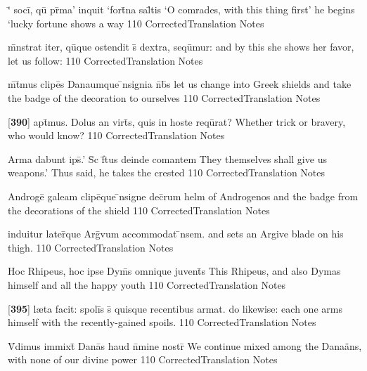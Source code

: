 \latline
  {`\={} soci\={\macron {\i}}, qu\={} pr\={\macron {\i}}ma' inquit `fort\={}na sal\={}tis}
  { `O comrades, with this thing first' he begins `lucky fortune shows a way }
  {110}
  { CorrectedTranslation }
  { Notes }


\latline
  {m\={}nstrat iter, qu\={}que ostendit s\={} dextra, sequ\={}mur:}
  { and by this she shows her favor, let us follow: }
  {110}
  { CorrectedTranslation }
  { Notes }


\latline
  {m\={}t\={}mus clipe\={}s Danaumque \={\macron {\i}}nsignia n\={}b\={\macron {\i}}s}
  { let us change into Greek shields and take the badge of the decoration to ourselves }
  {110}
  { CorrectedTranslation }
  { Notes }


\latline
  {[\textbf{390}] apt\={}mus.  Dolus an virt\={}s, quis in hoste requ\={\macron {\i}}rat?}
  { Whether trick or bravery, who would know? }
  {110}
  { CorrectedTranslation }
  { Notes }


\latline
  {Arma dabunt ips\={\macron {\i}}.'  S\={\macron {\i}}c f\={}tus deinde comantem}
  { They themselves shall give us weapons.'  Thus said, he takes the crested}
  {110}
  { CorrectedTranslation }
  { Notes }


\latline
  {Androge\={} galeam clipe\={\macron {\i}}que \={\macron {\i}}nsigne dec\={}rum}
  { helm of Androgenos and the badge from the decorations of the shield }
  {110}
  { CorrectedTranslation }
  { Notes }


\latline
  {induitur later\={\macron {\i}}que Arg\={\macron {\i}}vum accommodat \={}nsem.  }
  { and sets an Argive blade on his thigh. }
  {110}
  { CorrectedTranslation }
  { Notes }


\latline
  {Hoc Rhipeus, hoc ipse Dym\={}s omnique juvent\={}s}
  { This Rhipeus, and also Dymas himself and all the happy youth  }
  {110}
  { CorrectedTranslation }
  { Notes }


\latline
  {[\textbf{395}] l{\ae}ta facit:  spoli\={\macron {\i}}s s\={} quisque recentibus armat.}
  { do likewise:  each one arms himself with the recently-gained spoils. }
  {110}
  { CorrectedTranslation }
  { Notes }


\latline
  {V\={}dimus immixt\={\macron {\i}} Dana\={\macron {\i}}s haud n\={}mine nostr\={}}
  { We continue mixed among the Dana\"ans, with none of our divine power }
  {110}
  { CorrectedTranslation }
  { Notes }


